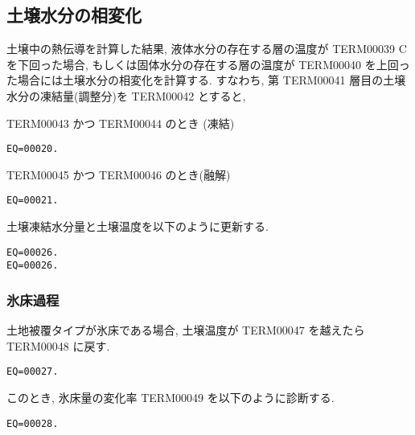 \subsection{土壌水分の相変化}

土壌中の熱伝導を計算した結果, 液体水分の存在する層の温度が TERM00039 C を下回った場合, もしくは固体水分の存在する層の温度が
TERM00040 を上回った場合には土壌水分の相変化を計算する.
すなわち, 第 TERM00041 層目の土壌水分の凍結量(調整分)を TERM00042 とすると,

TERM00043 かつ TERM00044 のとき
(凍結)
\begin{verbatim}
EQ=00020.
\end{verbatim}

TERM00045 かつ TERM00046 のとき(融解)
\begin{verbatim}
EQ=00021.
\end{verbatim}

土壌凍結水分量と土壌温度を以下のように更新する.
\begin{verbatim}
EQ=00026.
EQ=00026.
\end{verbatim}

\subsubsection{氷床過程}

土地被覆タイプが氷床である場合, 土壌温度が TERM00047 を越えたら
TERM00048 に戻す.
\begin{verbatim}
EQ=00027.
\end{verbatim}
このとき, 氷床量の変化率 TERM00049 を以下のように診断する.
\begin{verbatim}
EQ=00028.
\end{verbatim}
